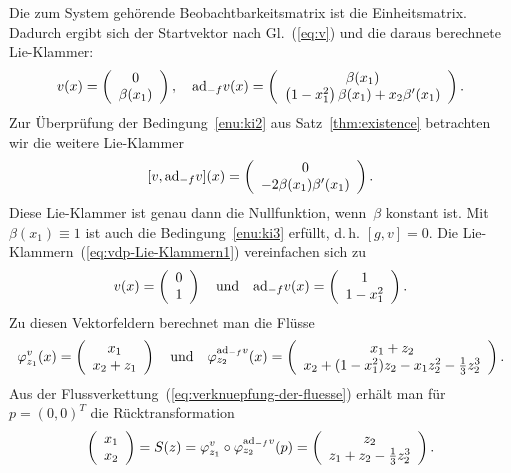 Die zum System gehörende Beobachtbarkeitsmatrix ist die Einheitsmatrix.
Dadurch ergibt sich der Startvektor nach Gl.~(\ref{eq:v}) und die
daraus berechnete Lie-Klammer:
\begin{equation}
v(x)=\left(\begin{array}{c}
0\\
\beta(x_{1})
\end{array}\right),\quad{\operatorname{ad}}_{-f}v(x)=\left(\begin{array}{c}
\beta(x_{1})\\
\left(1-x_{1}^{2}\right)\beta(x_{1})+x_{2}\beta^{\prime}(x_{1})
\end{array}\right).\label{eq:vdp-Lie-Klammern1}
\end{equation}
Zur Überprüfung der Bedingung~\ref{enu:ki2} aus Satz~\ref{thm:existence}
betrachten wir die weitere Lie-Klammer
\[
[v,{\operatorname{ad}}_{-f}v](x)=\left(\begin{array}{c}
0\\
-2\beta(x_{1})\beta^{\prime}(x_{1})
\end{array}\right).
\]
Diese Lie-Klammer ist genau dann die Nullfunktion, wenn~$\beta$
konstant ist. Mit $\beta(x_{1})\equiv1$ ist auch die Bedingung~\ref{enu:ki3}
erfüllt, d.\,h. $[g,v]=0$. Die Lie-Klammern~(\ref{eq:vdp-Lie-Klammern1})
vereinfachen sich zu 
\begin{equation}
v(x)=\left(\begin{array}{c}
0\\
1
\end{array}\right)\quad\text{und}\quad{\operatorname{ad}}_{-f}v(x)=\left(\begin{array}{c}
1\\
1-x_{1}^{2}
\end{array}\right).\label{eq:vdp-Lie-Klammern2}
\end{equation}
Zu diesen Vektorfeldern berechnet man die Flüsse
\[
\varphi_{z_{1}}^{v}(x)=\left(\begin{array}{c}
x_{1}\\
x_{2}+z_{1}
\end{array}\right)\quad\text{und}\quad\varphi_{z_{2}}^{{\operatorname{ad}}_{-f}v}(x)=\left(\begin{array}{c}
x_{1}+z_{2}\\
x_{2}+(1-x_{1}^{2})z_{2}-x_{1}z_{2}^{2}-\frac{1}{3}z_{2}^{3}
\end{array}\right).
\]
Aus der Flussverkettung~(\ref{eq:verknuepfung-der-fluesse}) erhält
man für $p=(0,0)^{T}$ die Rücktransformation 
\[
\left(\begin{array}{l}
x_{1}\\
x_{2}
\end{array}\right)=S(z)=\varphi_{z_{1}}^{v}\circ\varphi_{z_{2}}^{{\operatorname{ad}}_{-f}v}(p)=\left(\begin{array}{c}
z_{2}\\
z_{1}+z_{2}-\frac{1}{3}z_{2}^{3}
\end{array}\right).
\]
